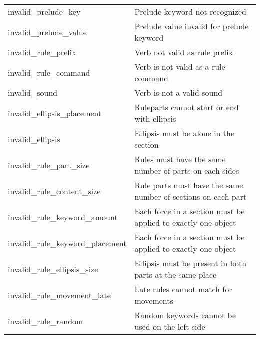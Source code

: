 \begin{table}[!htbp]
\begin{tabular}{ll}
invalid\_prelude\_key                               & Prelude keyword not recognized                                                 \\
invalid\_prelude\_value                             & Prelude value invalid for prelude keyword                                      \\
invalid\_rule\_prefix                               & Verb not valid as rule prefix                                                  \\
invalid\_rule\_command                              & Verb is not valid as a rule command                                            \\
invalid\_sound                                      & Verb is not a valid sound                                                      \\
invalid\_ellipsis\_placement                        & Ruleparts cannot start or end with ellipsis                                    \\
invalid\_ellipsis                                   & Ellipsis must be alone in the section                                          \\
invalid\_rule\_part\_size                           & Rules must have the same number of parts on each sides                         \\
invalid\_rule\_content\_size                        & Rule parts must have the same number of sections on each part                  \\
invalid\_rule\_keyword\_amount                      & Each force in a section must be applied to exactly one object                  \\
invalid\_rule\_keyword\_placement                   & Each force in a section must be applied to exactly one object                  \\
invalid\_rule\_ellipsis\_size                       & Ellipsis must be present in both parts at the same place                       \\
invalid\_rule\_movement\_late                       & Late rules cannot match for movements                                          \\
invalid\_rule\_random                               & Random keywords cannot be used on the left side                                \\
\end{tabular}
\end{table}

